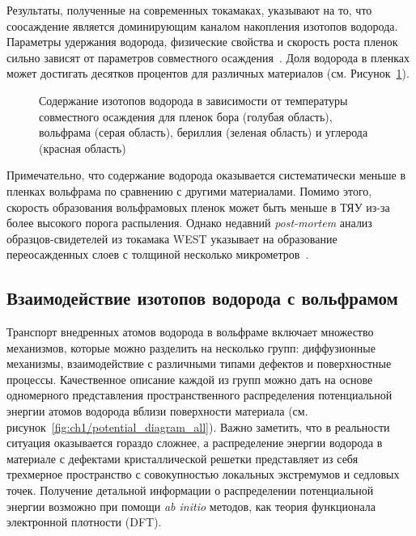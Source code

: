 Результаты, полученные на современных токамаках, указывают на то, что соосаждение является доминирующим каналом накопления изотопов водорода. Параметры удержания водорода, физические свойства и скорость роста пленок сильно зависят от параметров совместного осаждения~\cite{Gasparyan2019,Krat2020,Krat2025}. Доля водорода в пленках может достигать десятков процентов для различных материалов (см. Рисунок~\cref{fig:ch1/codeposition_review}).
\begin{figure}[ht]
    \caption{Содержание изотопов водорода в зависимости от температуры совместного осаждения для пленок бора (голубая область), вольфрама (серая область), бериллия (зеленая область) и углерода (красная область)~\cite{Pitts2025}}\label{fig:ch1/codeposition_review}
\end{figure}
Примечательно, что содержание водорода оказывается систематически меньше в пленках вольфрама по сравнению с другими материалами. Помимо этого, скорость образования вольфрамовых пленок может быть меньше в ТЯУ из-за более высокого порога распыления. Однако недавний \textit{post-mortem} анализ образцов-свидетелей из токамака WEST указывает на образование переосажденных слоев с толщиной несколько микрометров~\cite{Bucalossi2024}.

\subsection{Взаимодействие изотопов водорода с вольфрамом}\label{subsec:ch1/sec3/subsec4}

Транспорт внедренных атомов водорода в вольфраме включает множество механизмов, которые можно разделить на несколько групп: диффузионные механизмы, взаимодействие с различными типами дефектов и поверхностные процессы. Качественное описание каждой из групп можно дать на основе одномерного представления пространственного распределения потенциальной энергии атомов водорода вблизи поверхности материала (см. рисунок~\cref{fig:ch1/potential_diagram_all}). Важно заметить, что в реальности ситуация оказывается гораздо сложнее, а распределение энергии водорода в материале с дефектами кристаллической решетки представляет из себя трехмерное пространство с совокупностью локальных экстремумов и седловых точек. Получение детальной информации о распределении потенциальной энергии возможно при помощи \textit{ab initio} методов, как теория функционала электронной плотности (DFT).


